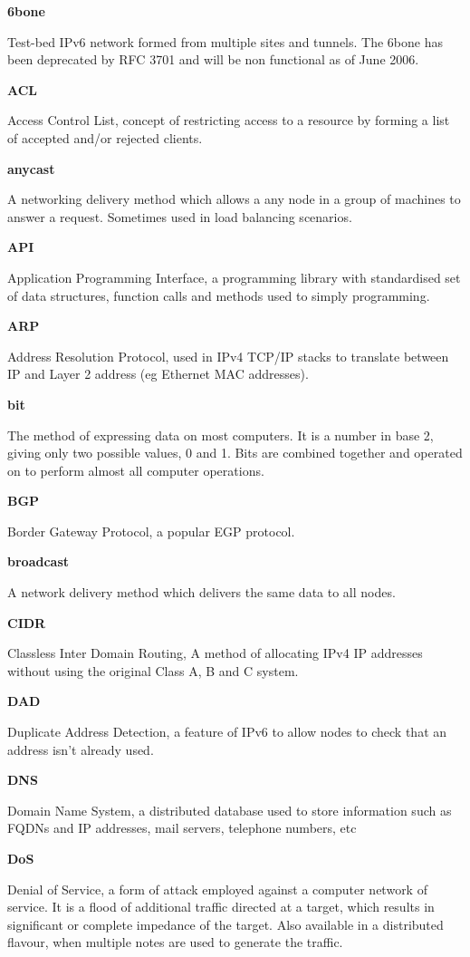 \textbf{6bone}

Test-bed IPv6 network formed from multiple sites and tunnels. The 6bone
has been deprecated by RFC 3701 and will be non functional as of June
2006.

\textbf{ACL}

Access Control List, concept of restricting access to a resource by
forming a list of accepted and/or rejected clients.

\textbf{anycast}

A networking delivery method which allows a any node in a group of 
machines to answer a request. Sometimes used in load balancing 
scenarios.

\textbf{API}

Application Programming Interface, a programming library with
standardised set of data structures, function calls and methods used to
simply programming.

\textbf{ARP}

Address Resolution Protocol, used in IPv4 TCP/IP stacks to translate 
between IP and Layer 2 address (eg Ethernet MAC addresses).

\textbf{bit}

The method of expressing data on most computers. It is a number in base
2, giving only two possible values, 0 and 1. Bits are combined together
and operated on to perform almost all computer operations.

\textbf{BGP}

Border Gateway Protocol, a popular EGP protocol.  

\textbf{broadcast}

A network delivery method which delivers the same data to all nodes.

\textbf{CIDR}

Classless Inter Domain Routing, A method of allocating IPv4 IP addresses
without using the original Class A, B and C system.

\textbf{DAD}

Duplicate Address Detection, a feature of IPv6 to allow nodes to check
that an address isn't already used.

\textbf{DNS}

Domain Name System, a distributed database used to store information
such as FQDNs and IP addresses, mail servers, telephone numbers, etc

\textbf{DoS}

Denial of Service, a form of attack employed against a computer network
of service. It is a flood of additional traffic directed at a target,
which results in significant or complete impedance of the target. Also
available in a distributed flavour, when multiple notes are used to
generate the traffic.

